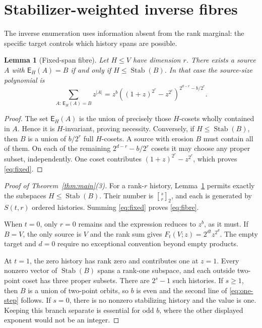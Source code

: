 \documentclass[a4paper,10pt]{amsart}
\newtheorem{lemma}[theorem]{Lemma}
\newcommand{\E}{\mathsf E}
\newcommand{\Stab}{\operatorname{Stab}}
\begin{document}
\section{Stabilizer-weighted inverse fibres}

The inverse enumeration uses information absent from the rank marginal: the
specific target controls which history spans are possible.

\begin{lemma}[Fixed-span fibre]\label{lem:fixed}
Let $H\leq V$ have dimension $r$.  There exists a source $A$ with
$\E_H(A)=B$ if and only if $H\leq\Stab(B)$.  In that case the source-size
polynomial is
\begin{equation}\label{eq:fixed}
 \sum_{A:\,\E_H(A)=B}z^{|A|}
 =z^b\left((1+z)^{2^r}-z^{2^r}\right)^{2^{d-r}-b/2^r}.
\end{equation}
\end{lemma}

\begin{proof}
The set $\E_H(A)$ is the union of precisely those $H$-cosets wholly contained
in $A$.  Hence it is $H$-invariant, proving necessity.  Conversely, if
$H\leq\Stab(B)$, then $B$ is a union of $b/2^r$ full $H$-cosets.  A source
with erosion $B$ must contain all of them.  On each of the remaining
$2^{d-r}-b/2^r$ cosets it may choose any proper subset, independently.  One
coset contributes $(1+z)^{2^r}-z^{2^r}$, which proves \eqref{eq:fixed}.
\end{proof}

\begin{proof}[Proof of Theorem~\ref{thm:main}(3)]
For a rank-$r$ history, Lemma~\ref{lem:fixed} permits exactly the subspaces
$H\leq\Stab(B)$.  Their number is
$\genfrac{[}{]}{0pt}{}{s}{r}_2$, and each is generated by $S(t,r)$ ordered
histories.  Summing \eqref{eq:fixed} proves \eqref{eq:fibre}.

When $t=0$, only $r=0$ remains and the expression reduces to $z^b$, as it
must.  If $B=V$, the only source is $V$ and the rank sum gives
$F_t(V;z)=2^{dt}z^{2^d}$.  The empty target and $d=0$ require no exceptional
convention beyond empty products.

At $t=1$, the zero history has rank zero and contributes one at $z=1$.
Every nonzero vector of $\Stab(B)$ spans a rank-one subspace, and each outside
two-point coset has three proper subsets.  There are $2^s-1$ such histories.
If $s\geq1$, then $B$ is a union of two-point orbits, so $b$ is even and the
second line of \eqref{eq:one-step} follows.  If $s=0$, there is no nonzero
stabilizing history and the value is one.  Keeping this branch separate is
essential for odd $b$, where the other displayed exponent would not be an
integer.
\end{proof}
\end{document}
